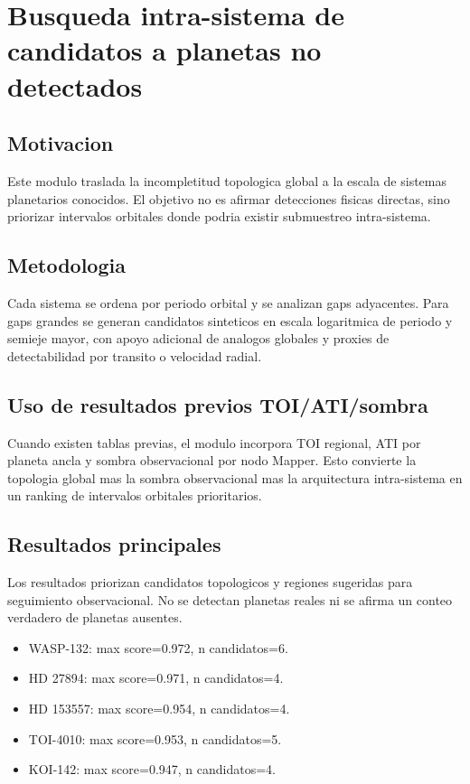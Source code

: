 \section{Busqueda intra-sistema de candidatos a planetas no detectados}

\subsection{Motivacion}

Este modulo traslada la incompletitud topologica global a la escala de sistemas planetarios conocidos. El objetivo no es afirmar detecciones fisicas directas, sino priorizar intervalos orbitales donde podria existir submuestreo intra-sistema.

\subsection{Metodologia}

Cada sistema se ordena por periodo orbital y se analizan gaps adyacentes. Para gaps grandes se generan candidatos sinteticos en escala logaritmica de periodo y semieje mayor, con apoyo adicional de analogos globales y proxies de detectabilidad por transito o velocidad radial.

\subsection{Uso de resultados previos TOI/ATI/sombra}

Cuando existen tablas previas, el modulo incorpora TOI regional, ATI por planeta ancla y sombra observacional por nodo Mapper. Esto convierte la topologia global mas la sombra observacional mas la arquitectura intra-sistema en un ranking de intervalos orbitales prioritarios.

\subsection{Resultados principales}

Los resultados priorizan candidatos topologicos y regiones sugeridas para seguimiento observacional. No se detectan planetas reales ni se afirma un conteo verdadero de planetas ausentes.

\begin{itemize}

\item WASP-132: max score=0.972, n candidatos=6.

\item HD 27894: max score=0.971, n candidatos=4.

\item HD 153557: max score=0.954, n candidatos=4.

\item TOI-4010: max score=0.953, n candidatos=5.

\item KOI-142: max score=0.947, n candidatos=4.

\end{itemize}

